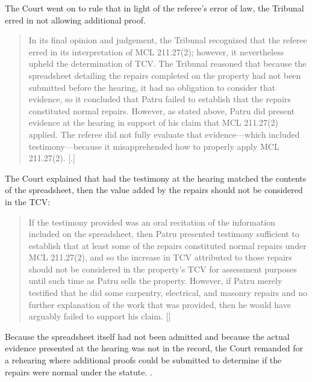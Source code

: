 \documentclass[12pt,\documentclassflag]{michiganCourtOfAppealsBrief}
\begin{document}
The Court went on to rule that in light of the referee's error of law, the Tribunal erred in not allowing additional proof.

\begin{quote} In its final opinion and judgement, the Tribunal recognized that the referee erred in its
interpretation of MCL 211.27(2); however, it nevertheless upheld the determination of TCV.
The Tribunal reasoned that because the spreadsheet detailing the repairs completed on the
property had not been submitted before the hearing, it had no obligation to consider that
evidence, so it concluded that Patru failed to establish that the repairs constituted normal repairs.
However, as stated above, Patru did present evidence at the hearing in support of his claim that
MCL 211.27(2) applied. The referee did not fully evaluate that evidence—which included
testimony—because it misapprehended how to properly apply MCL 211.27(2).
  [.]
\end{quote}

The Court explained that had the testimony at the hearing matched the contents of the spreadsheet, then the value added by the repairs should not be considered in the TCV:

\begin{quote}If the testimony provided was an oral recitation of the
information included on the spreadsheet, then Patru presented testimony sufficient to establish
that at least some of the repairs constituted normal repairs under MCL 211.27(2), and so the
increase in TCV attributed to those repairs should not be considered in the property’s TCV for
assessment purposes until such time as Patru sells the property. However, if Patru merely
testified that he did some carpentry, electrical, and masonry repairs and no further explanation of
the work that was provided, then he would have arguably failed to support his claim. []
\end{quote}

Because the spreadsheet itself had not been admitted and because the actual evidence presented at the hearing was not in the record, the Court remanded for a rehearing where additional proofs could be submitted to determine if the repairs were normal under the statute. .



\end{document}
